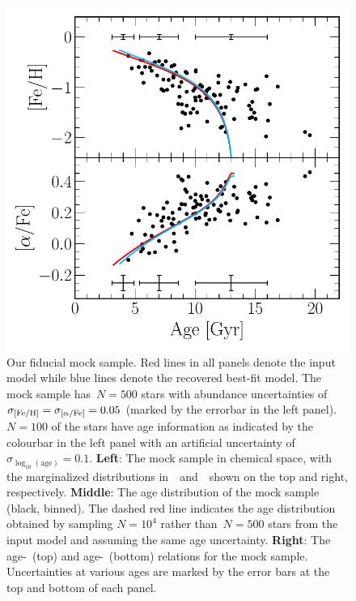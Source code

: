 {\begin{landscape}
\begin{figure}
\includegraphics[scale = 0.46]{fiducial_mock_amr.pdf}
\caption{
Our fiducial mock sample.
Red lines in all panels denote the input model while blue lines denote the
recovered best-fit model.
The mock sample has~$N = 500$ stars with abundance uncertainties of
$\sigma_{\text{[Fe/H]}} = \sigma_{\text{[$\alpha$/Fe]}} = 0.05$ (marked by the errorbar in the left panel).
$N = 100$ of the stars have age information as indicated by the colourbar in
the left panel with an artificial uncertainty
of~$\sigma_{\log_{10}(\text{age})} = 0.1$.
\textbf{Left}: The mock sample in chemical space, with the marginalized
distributions in~\feh~and~\afe~shown on the top and right, respectively.
\textbf{Middle}: The age distribution of the mock sample (black, binned).
The dashed red line indicates the age distribution obtained by sampling
$N = 10^4$ rather than~$N = 500$ stars from the input model and assuming the
same age uncertainty.
\textbf{Right}: The age-\feh~(top) and age-\afe~(bottom) relations for the mock
sample.
Uncertainties at various ages are marked by the error bars at the top and
bottom of each panel.
}
\label{dga:fig:fiducial_mock}
\end{figure}
\end{landscape}
\clearpage
}

